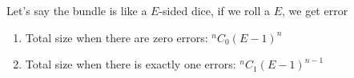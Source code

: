 \documentclass[10pt]{article}
\newcommand*{\Co}[2]{{}^{#1}C_{#2}}%
\newenvironment{solution}[2][Solution]{ \begin{trivlist}
\item[\hskip \labelsep {\bfseries #1}]}{\end{trivlist}}
\begin{document}
\begin{solution}{1}
\begin{enumerate}[label=(\alph*)]

    Let’s say the bundle is like a $E$-sided dice, if we roll a $E$, we get error
    \begin{enumerate}[label=(\arabic*)]
    \parskip=0in
    \parsep=0in
    \itemsep=0.1in
    \item Total size when there are zero errors:  $\Co{n}{0} (E - 1)^n$ \item Total size when there is exactly one errors:  $\Co{n}{1} (E - 1)^{n-1}$

\end{enumerate}
\end{enumerate}
\end{solution}
\end{document}
